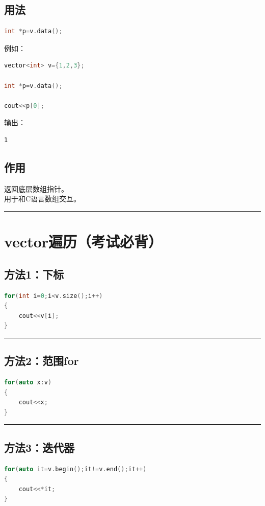 \documentclass[10pt,twocolumn]{extarticle}
\begin{document}
\subsection{用法}
\begin{lstlisting}[language=C++]
int *p=v.data();
\end{lstlisting}
例如：
\begin{lstlisting}[language=C++]
vector<int> v={1,2,3};

int *p=v.data();

cout<<p[0];
\end{lstlisting}
输出：
\begin{lstlisting}
1
\end{lstlisting}

\subsection{作用}
返回底层数组指针。\\
用于和C语言数组交互。

\noindent\rule{\linewidth}{0.4pt}

\section{vector遍历（考试必背）}

\subsection{方法1：下标}
\begin{lstlisting}[language=C++]
for(int i=0;i<v.size();i++)
{
    cout<<v[i];
}
\end{lstlisting}

\noindent\rule{\linewidth}{0.4pt}

\subsection{方法2：范围for}
\begin{lstlisting}[language=C++]
for(auto x:v)
{
    cout<<x;
}
\end{lstlisting}

\noindent\rule{\linewidth}{0.4pt}

\subsection{方法3：迭代器}
\begin{lstlisting}[language=C++]
for(auto it=v.begin();it!=v.end();it++)
{
    cout<<*it;
}
\end{lstlisting}
\end{document}
